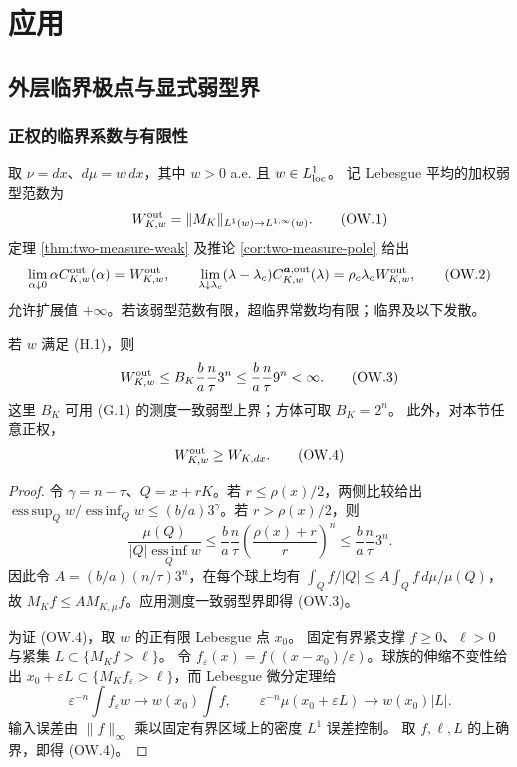 \section{应用}\label{sec:applications}
\subsection{外层临界极点与显式弱型界}\label{sec:outer-critical-app}
\subsubsection{正权的临界系数与有限性}
取 $\nu=dx$、$d\mu=w\,dx$，其中 $w>0$ a.e. 且 $w\in L^1_{\rm loc}$。
记 Lebesgue 平均的加权弱型范数为
\[W^{\rm out}_{K,w}=\|M_K\|_{L^1(w)\to L^{1,\infty}(w)}.
\tag{OW.1}\]
定理 \ref{thm:two-measure-weak} 及推论 \ref{cor:two-measure-pole} 给出
\[\lim_{\alpha\downarrow0}\alpha C^{\rm out}_{K,w}(\alpha)=W^{\rm out}_{K,w},\qquad
\lim_{\lambda\downarrow\lambda_c}(\lambda-\lambda_c)
C^{\boldsymbol a,\rm out}_{K,w}(\lambda)
=\rho_c\lambda_c W^{\rm out}_{K,w},\tag{OW.2}\]
允许扩展值 $+\infty$。若该弱型范数有限，超临界常数均有限；临界及以下发散。

\begin{proposition}\label{prop:outer-finite-weak}
若 $w$ 满足 (H.1)，则
\[W^{\rm out}_{K,w}\le B_K\frac ba\frac n\tau3^n
\le\frac ba\frac n\tau9^n<\infty.\tag{OW.3}\]
这里 $B_K$ 可用 (G.1) 的测度一致弱型上界；方体可取 $B_K=2^n$。
此外，对本节任意正权，
\[W^{\rm out}_{K,w}\ge W_{K,dx}.\tag{OW.4}\]
\end{proposition}
\begin{proof}
令 $\gamma=n-\tau$、$Q=x+rK$。若 $r\le\rho(x)/2$，两侧比较给出
$\operatorname*{ess\,sup}_Qw/\operatorname*{ess\,inf}_Qw\le(b/a)3^\gamma$。若 $r>\rho(x)/2$，则
\[\frac{\mu(Q)}{|Q|\operatorname*{ess\,inf}_Qw}
\le\frac ba\frac n\tau\left(\frac{\rho(x)+r}{r}\right)^n
\le\frac ba\frac n\tau3^n.\]
因此令 $A=(b/a)(n/\tau)3^n$，在每个球上均有
$\int_Q f/|Q|\le A\int_Q f\,d\mu/\mu(Q)$，故
$M_Kf\le A M_{K,\mu}f$。应用测度一致弱型界即得 (OW.3)。

为证 (OW.4)，取 $w$ 的正有限 Lebesgue 点 $x_0$。
固定有界紧支撑 $f\ge0$、$\ell>0$ 与紧集 $L\subset\{M_Kf>\ell\}$。
令 $f_\varepsilon(x)=f((x-x_0)/\varepsilon)$。球族的伸缩不变性给出
$x_0+\varepsilon L\subset\{M_Kf_\varepsilon>\ell\}$，而 Lebesgue 微分定理给
\[\varepsilon^{-n}\int f_\varepsilon w\to w(x_0)\int f,\qquad
\varepsilon^{-n}\mu(x_0+\varepsilon L)\to w(x_0)|L|.\]
输入误差由 $\|f\|_\infty$ 乘以固定有界区域上的密度 $L^1$ 误差控制。
取 $f,\ell,L$ 的上确界，即得 (OW.4)。
\end{proof}

